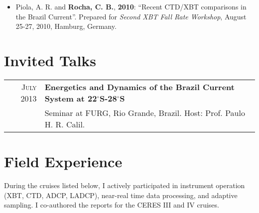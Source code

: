 \documentclass[pagestart=firstchapter]{article}
\begin{document}
\begin{itemize}
    \item   Piola, A. R. and \textbf{Rocha, C. B.}, \textbf{2010}: ``Recent CTD/XBT comparisons in the Brazil Current''. Prepared for  \textit{Second XBT Fall Rate Workshop}, August 25-27, 2010, Hamburg, Germany. 
\end{itemize}






\section*{Invited Talks}

\begin{tabular}{rl}
    \textsc{July 2013} & \textbf{Energetics and Dynamics of the Brazil Current System at 22$^\circ$S-28$^\circ$S}\\
    & Seminar at FURG, Rio Grande, Brazil. Host: Prof. Paulo H. R. Calil. \\
\end{tabular}




\section*{Field Experience}
During the cruises listed below, I actively participated in instrument operation (XBT, CTD, ADCP, LADCP), near-real time data processing, and adaptive sampling. I co-authored the reports for the CERES III and IV cruises.\\
\end{document}

